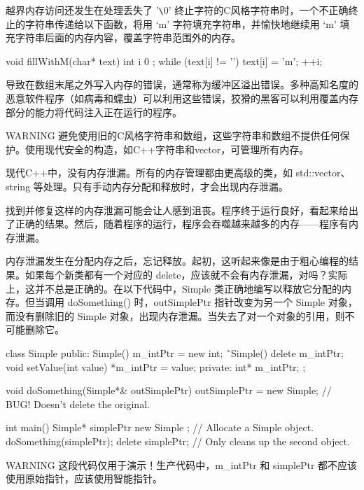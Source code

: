 越界内存访问还发生在处理丢失了 '\verb|\|0' 终止字符的C风格字符串时，一个不正确终止的字符串传递给以下函数，将用 ‘m’ 字符填充字符串，并愉快地继续用 ‘m’ 填充字符串后面的内存内容，覆盖字符串范围外的内存。

\begin{cpp}
void fillWithM(char* text)
{
    int i { 0 };
    while (text[i] != '\0') {
        text[i] = 'm';
        ++i;
    }
}
\end{cpp}

导致在数组末尾之外写入内存的错误，通常称为缓冲区溢出错误。多种高知名度的恶意软件程序（如病毒和蠕虫）可以利用这些错误，狡猾的黑客可以利用覆盖内存部分的能力将代码注入正在运行的程序。

\begin{myWarning}{WARNING}
避免使用旧的C风格字符串和数组，这些字符串和数组不提供任何保护。使用现代安全的构造，如C++字符串和vector，可管理所有内存。
\end{myWarning}


现代C++中，没有内存泄漏。所有的内存管理都由更高级的类，如 std::vector、string 等处理。只有手动内存分配和释放时，才会出现内存泄漏。

找到并修复这样的内存泄漏可能会让人感到沮丧。程序终于运行良好，看起来给出了正确的结果。然后，随着程序的运行，程序会吞噬越来越多的内存——程序有内存泄漏。

内存泄漏发生在分配内存之后，忘记释放。起初，这听起来像是由于粗心编程的结果。如果每个新类都有一个对应的 delete，应该就不会有内存泄漏，对吗？实际上，这并不总是正确的。在以下代码中，Simple 类正确地编写以释放它分配的内存。但当调用 doSomething() 时，outSimplePtr 指针改变为另一个 Simple 对象，而没有删除旧的 Simple 对象，出现内存泄漏。当失去了对一个对象的引用，则不可能删除它。

\begin{cpp}
class Simple
{
    public:
    Simple() { m_intPtr = new int{}; }
    ˜Simple() { delete m_intPtr; }
    void setValue(int value) { *m_intPtr = value; }
    private:
    int* m_intPtr;
};

void doSomething(Simple*& outSimplePtr)
{
    outSimplePtr = new Simple{}; // BUG! Doesn't delete the original.
}

int main()
{
    Simple* simplePtr { new Simple{} }; // Allocate a Simple object.
    doSomething(simplePtr);
    delete simplePtr; // Only cleans up the second object.
}
\end{cpp}

\begin{myWarning}{WARNING}
这段代码仅用于演示！生产代码中，m\_intPtr 和 simplePtr 都不应该使用原始指针，应该使用智能指针。
\end{myWarning}

